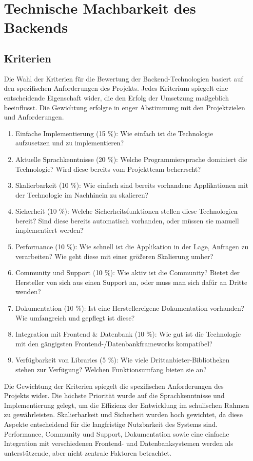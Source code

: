 \section{Technische Machbarkeit des Backends}
\subsection{Kriterien}
Die Wahl der Kriterien für die Bewertung der Backend-Technologien basiert auf den spezifischen Anforderungen des Projekts. Jedes Kriterium spiegelt eine entscheidende Eigenschaft wider, die den Erfolg der Umsetzung maßgeblich beeinflusst. Die Gewichtung erfolgte in enger Abstimmung mit den Projektzielen und Anforderungen.
\begin{enumerate}
	\item Einfache Implementierung (15 \%): Wie einfach ist die Technologie aufzusetzen und zu implementieren?
	\item Aktuelle Sprachkenntnisse (20 \%): Welche Programmiersprache dominiert die Technologie? Wird diese bereits vom Projektteam beherrscht?
	\item Skalierbarkeit (10 \%): Wie einfach sind bereits vorhandene Applikationen mit der Technologie im Nachhinein zu skalieren?
	\item Sicherheit (10 \%): Welche Sicherheitsfunktionen stellen diese Technologien bereit? Sind diese bereits automatisch vorhanden, oder müssen sie manuell implementiert werden?
	\item Performance (10 \%): Wie schnell ist die Applikation in der Lage, Anfragen zu verarbeiten? Wie geht diese mit einer größeren Skalierung umher?
	\item Community und Support (10 \%): Wie aktiv ist die Community? Bietet der Hersteller von sich aus einen Support an, oder muss man sich dafür an Dritte wenden?
	\item Dokumentation (10 \%): Ist eine Herstellereigene Dokumentation vorhanden? Wie umfangreich und gepflegt ist diese?
	\item Integration mit Frontend \& Datenbank (10 \%): Wie gut ist die Technologie mit den gängigsten Frontend-/Datenbankframeworks kompatibel?
    \item Verfügbarkeit von Libraries (5 \%): Wie viele Drittanbieter-Bibliotheken stehen zur Verfügung? Welchen Funktionsumfang bieten sie an?
\end{enumerate}

Die Gewichtung der Kriterien spiegelt die spezifischen Anforderungen des Projekts wider. Die höchste Priorität wurde auf die Sprachkenntnisse und Implementierung gelegt, um die Effizienz der Entwicklung im schulischen Rahmen zu gewährleisten. Skalierbarkeit und Sicherheit wurden hoch gewichtet, da diese Aspekte entscheidend für die langfristige Nutzbarkeit des Systems sind. Performance, Community und Support, Dokumentation sowie eine einfache Integration mit verschiedenen Frontend- und Datenbanksystemen werden als unterstützende, aber nicht zentrale Faktoren betrachtet.

